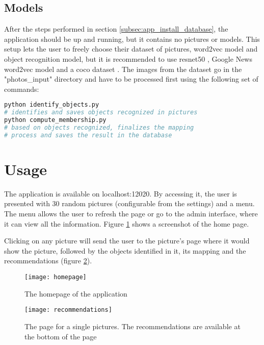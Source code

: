 \subsection{Models}
\label{subsec:app_install_models}

After the steps performed in section \ref{subsec:app_install_database}, the application should be up and running, but it contains no pictures or models. This setup lets the user to freely choose their dataset of pictures, word2vec model and object recognition model, but it is recommended to use resnet50 \cite{image-ai}, Google News word2vec model \cite{word2vec-datasets} and a coco dataset \cite{coco}. The images from the dataset go in the "photos\_input" directory and have to be processed first using the following set of commands:

\begin{lstlisting}[language=Bash]
python identify_objects.py 
# identifies and saves objects recognized in pictures
python compute_membership.py 
# based on objects recognized, finalizes the mapping 
# process and saves the result in the database
\end{lstlisting}

\section{Usage}
\label{sec:app_usage}

The application is available on localhost:12020. By accessing it, the user is presented with 30 random pictures (configurable from the settings) and a menu. The menu allows the user to refresh the page or go to the admin interface, where it can view all the information. Figure \ref{fig:homepage} shows a screenshot of the home page.

Clicking on any picture will send the user to the picture's page where it would show the picture, followed by the objects identified in it, its mapping and the recommendations (figure \ref{fig:recommendations}).

\begin{figure}[b!]
\centering
\texttt{[image: homepage]}
\caption{The homepage of the application}
\label{fig:homepage}
\end{figure}

\begin{figure}[b!]
\centering
\texttt{[image: recommendations]}
\caption{The page for a single pictures. The recommendations are available at the bottom of the page}
\label{fig:recommendations}
\end{figure}

